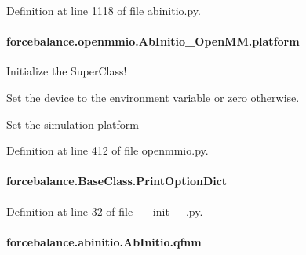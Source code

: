 Definition at line 1118 of file abinitio.\-py.

\hypertarget{classforcebalance_1_1openmmio_1_1AbInitio__OpenMM_ae6977017b553e5d6dd47258f67fcdf1c}{
\paragraph[{platform}]{\setlength{\rightskip}{0pt plus 5cm}forcebalance.\-openmmio.\-Ab\-Initio\-\_\-\-Open\-M\-M.\-platform}}\label{classforcebalance_1_1openmmio_1_1AbInitio__OpenMM_ae6977017b553e5d6dd47258f67fcdf1c}


Initialize the Super\-Class! 

Set the device to the environment variable or zero otherwise.

Set the simulation platform 

Definition at line 412 of file openmmio.\-py.

\hypertarget{classforcebalance_1_1BaseClass_afc6659278497d7245bc492ecf405ccae}{
\paragraph[{Print\-Option\-Dict}]{\setlength{\rightskip}{0pt plus 5cm}forcebalance.\-Base\-Class.\-Print\-Option\-Dict\hspace{0.3cm}{\ttfamily [inherited]}}}\label{classforcebalance_1_1BaseClass_afc6659278497d7245bc492ecf405ccae}


Definition at line 32 of file \-\_\-\-\_\-init\-\_\-\-\_\-.\-py.

\hypertarget{classforcebalance_1_1abinitio_1_1AbInitio_ac93db408472034937e79572bf872886c}{
\paragraph[{qfnm}]{\setlength{\rightskip}{0pt plus 5cm}forcebalance.\-abinitio.\-Ab\-Initio.\-qfnm\hspace{0.3cm}{\ttfamily [inherited]}}}\label{classforcebalance_1_1abinitio_1_1AbInitio_ac93db408472034937e79572bf872886c}


